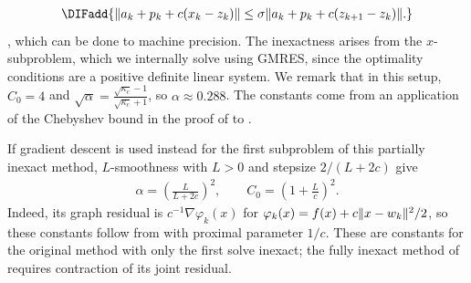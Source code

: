 \documentclass[11pt]{article}
\begin{document}
\DIFdelbegin {}\DIFdelend \DIFaddbegin {}\begin{align}
    \DIFadd{\norm{a_k+p_k+c(x_k-z_k)}\leq\sigma\norm{a_k+p_k+c(z_{k+1}-z_k)}.
}\end{align}
\DIFaddend , which can be done to machine precision\DIFaddbegin {}\DIFaddend .
The inexactness arises from the $x$-subproblem, which we internally solve using GMRES, since the optimality conditions are a positive definite linear system.
We remark that in this setup, $C_0 =4$ and $\sqrt{\alpha} = \frac{\sqrt{\kappa_c}-1}{\sqrt{\kappa_c}+1}$, so $\alpha\approx 0.288$.
The constants come from an application of the Chebyshev bound in the proof of \citet[Theorem 38.5]{Trefethen1997NumericalLinearAlgebra} to \citet[Proposition 4]{saad1986GMRES}.
\begin{admmaddition}


If gradient descent is used instead for the first subproblem of this partially inexact method, $L$-smoothness with $L>0$ and stepsize $2/(L+2c)$ give
\begin{align}
    \alpha=\left(\frac{L}{L+2c}\right)^2,\qquad C_0=\left(1+\frac{L}{c}\right)^2.
\end{align}
Indeed, its graph residual is $c^{-1}\nabla\varphi_k(x)$ for $\varphi_k(x)=f(x)+c\lVert x-w_k\rVert^2/2$, so these constants follow from  with proximal parameter $1/c$.
These are constants for the original method with only the first solve inexact; the fully inexact method of  requires contraction of its joint residual.
\end{admmaddition}
\end{document}

